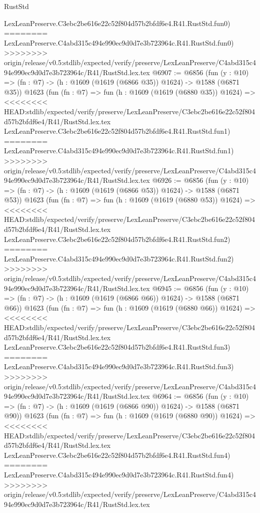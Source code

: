 \begin{lexlean}{RustStd}
\begin{coremodule}
{\begin{coremodule}
{{{{{{{{{{{{{{    LexLeanPreserve.C3ebc2be616e22c52f804d57b2bfdf6e4.R41.RustStd.fun0)
========
    LexLeanPreserve.C4abd315c494e990ec9d0d7e3b723964c.R41.RustStd.fun0)
>>>>>>>> origin/release/v0.5:stdlib/expected/verify/preserve/LexLeanPreserve/C4abd315c494e990ec9d0d7e3b723964c/R41/RustStd.lex.tex
@6907 := @6856
    (fun (y : @10) => (fn : @7) -> (h : @1609 (@1619 (@6866 @35)) @1624) -> @1588 (@6871 @35))
    @1623
    (fun (fn : @7) =>
    fun (h : @1609 (@1619 (@6880 @35)) @1624) =>
<<<<<<<< HEAD:stdlib/expected/verify/preserve/LexLeanPreserve/C3ebc2be616e22c52f804d57b2bfdf6e4/R41/RustStd.lex.tex
    LexLeanPreserve.C3ebc2be616e22c52f804d57b2bfdf6e4.R41.RustStd.fun1)
========
    LexLeanPreserve.C4abd315c494e990ec9d0d7e3b723964c.R41.RustStd.fun1)
>>>>>>>> origin/release/v0.5:stdlib/expected/verify/preserve/LexLeanPreserve/C4abd315c494e990ec9d0d7e3b723964c/R41/RustStd.lex.tex
@6926 := @6856
    (fun (y : @10) => (fn : @7) -> (h : @1609 (@1619 (@6866 @53)) @1624) -> @1588 (@6871 @53))
    @1623
    (fun (fn : @7) =>
    fun (h : @1609 (@1619 (@6880 @53)) @1624) =>
<<<<<<<< HEAD:stdlib/expected/verify/preserve/LexLeanPreserve/C3ebc2be616e22c52f804d57b2bfdf6e4/R41/RustStd.lex.tex
    LexLeanPreserve.C3ebc2be616e22c52f804d57b2bfdf6e4.R41.RustStd.fun2)
========
    LexLeanPreserve.C4abd315c494e990ec9d0d7e3b723964c.R41.RustStd.fun2)
>>>>>>>> origin/release/v0.5:stdlib/expected/verify/preserve/LexLeanPreserve/C4abd315c494e990ec9d0d7e3b723964c/R41/RustStd.lex.tex
@6945 := @6856
    (fun (y : @10) => (fn : @7) -> (h : @1609 (@1619 (@6866 @66)) @1624) -> @1588 (@6871 @66))
    @1623
    (fun (fn : @7) =>
    fun (h : @1609 (@1619 (@6880 @66)) @1624) =>
<<<<<<<< HEAD:stdlib/expected/verify/preserve/LexLeanPreserve/C3ebc2be616e22c52f804d57b2bfdf6e4/R41/RustStd.lex.tex
    LexLeanPreserve.C3ebc2be616e22c52f804d57b2bfdf6e4.R41.RustStd.fun3)
========
    LexLeanPreserve.C4abd315c494e990ec9d0d7e3b723964c.R41.RustStd.fun3)
>>>>>>>> origin/release/v0.5:stdlib/expected/verify/preserve/LexLeanPreserve/C4abd315c494e990ec9d0d7e3b723964c/R41/RustStd.lex.tex
@6964 := @6856
    (fun (y : @10) => (fn : @7) -> (h : @1609 (@1619 (@6866 @90)) @1624) -> @1588 (@6871 @90))
    @1623
    (fun (fn : @7) =>
    fun (h : @1609 (@1619 (@6880 @90)) @1624) =>
<<<<<<<< HEAD:stdlib/expected/verify/preserve/LexLeanPreserve/C3ebc2be616e22c52f804d57b2bfdf6e4/R41/RustStd.lex.tex
    LexLeanPreserve.C3ebc2be616e22c52f804d57b2bfdf6e4.R41.RustStd.fun4)
========
    LexLeanPreserve.C4abd315c494e990ec9d0d7e3b723964c.R41.RustStd.fun4)
>>>>>>>> origin/release/v0.5:stdlib/expected/verify/preserve/LexLeanPreserve/C4abd315c494e990ec9d0d7e3b723964c/R41/RustStd.lex.tex
}}}}}}}}}}}}}}
\end{coremodule}}
\end{coremodule}
\end{lexlean}

